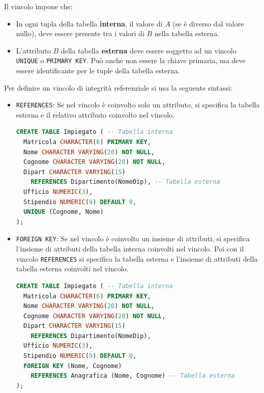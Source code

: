 \documentclass[a4paper,twoside]{article}
\begin{document}
Il vincolo impone che:
\begin{itemize}
  \item In ogni tupla della tabella \textbf{interna}, il valore di
    \( A \) (se è diverso dal valore nullo), deve essere presente tra i valori di \( B \) 
    nella tabella esterna.

  \item L'attributo \( B \) della tabella \textbf{esterna} deve essere soggetto ad
    un vincolo \texttt{UNIQUE} o \texttt{PRIMARY KEY}. Può anche non essere la chiave
    primaria, ma deve essere identificante per le tuple della tabella esterna.
\end{itemize}
Per definire un vincolo di integrità referenziale si usa la seguente sintassi:
\begin{itemize}
  \item \texttt{REFERENCES}: Se nel vincolo è coinvolto solo un attributo, si
    specifica la tabella esterna e il relativo attributo coinvolto nel vincolo.

\begin{lstlisting}[language=SQL]
CREATE TABLE Impiegato ( -- Tabella interna
  Matricola CHARACTER(6) PRIMARY KEY,
  Nome CHARACTER VARYING(20) NOT NULL,
  Cognome CHARACTER VARYING(20) NOT NULL,
  Dipart CHARACTER VARYING(15)
    REFERENCES Dipartimento(NomeDip), -- Tabella esterna
  Ufficio NUMERIC(3),
  Stipendio NUMERIC(9) DEFAULT 0,
  UNIQUE (Cognome, Nome)
);
\end{lstlisting}

  \item \texttt{FOREIGN KEY}: Se nel vincolo è coinvolto un insieme di attributi,
    si specifica l'insieme di attributi della tabella interna coinvolti nel vincolo.
    Poi con il vincolo \texttt{REFERENCES} si specifica
    la tabella esterna e l'insieme di attributi della tabella esterna coinvolti nel
    vincolo.

\begin{lstlisting}[language=SQL]
CREATE TABLE Impiegato ( -- Tabella interna
  Matricola CHARACTER(6) PRIMARY KEY,
  Nome CHARACTER VARYING(20) NOT NULL,
  Cognome CHARACTER VARYING(20) NOT NULL,
  Dipart CHARACTER VARYING(15)
    REFERENCES Dipartimento(NomeDip),
  Ufficio NUMERIC(3),
  Stipendio NUMERIC(9) DEFAULT 0,
  FOREIGN KEY (Nome, Cognome)
    REFERENCES Anagrafica (Nome, Cognome) -- Tabella esterna
);
\end{lstlisting}

\end{itemize}
\end{document}
